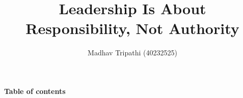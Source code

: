 \documentclass[runningheads]{llncs}
\begin{document}
%
\title{Leadership Is About Responsibility, Not Authority}
%
%
\author{
Madhav Tripathi (40232525)
}
%
%
%
\maketitle              %
%

\vspace{10mm}
\begin{center}
\Large\textbf{ Table of contents}\\[1ex]
\end{center}
\end{document}
